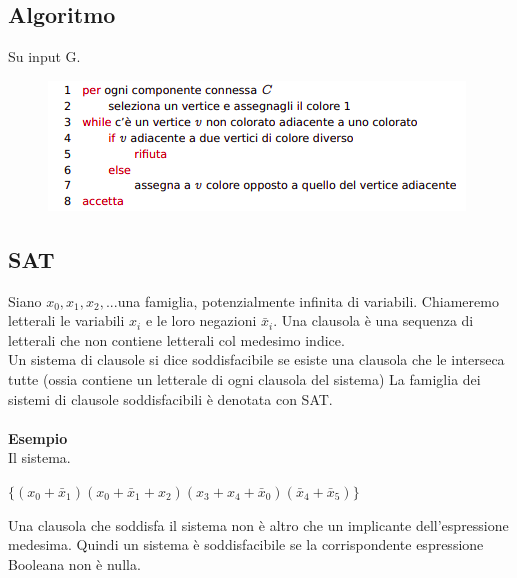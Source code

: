 \subsection{Algoritmo}
Su input G.
\begin{figure}[htp]
    \includegraphics[scale=0.9]{tesi_stile/img/foto2cap10.png}
\end{figure}
\subsection{SAT}
Siano $x_0, x_1, x_2,...$una famiglia, potenzialmente infinita di variabili. Chiameremo letterali le variabili $x_i$ e le loro negazioni $\bar{x}_i$. Una clausola è una sequenza di letterali che non contiene letterali col
medesimo indice.\\
Un sistema di clausole si dice soddisfacibile se esiste una clausola che le interseca tutte (ossia contiene un letterale di ogni clausola del sistema) La famiglia dei sistemi di clausole soddisfacibili è denotata con SAT.\\\\
\textbf{Esempio}\\
Il sistema.
\begin{center}
    $\{(x_0 + \bar{x}_1)(x_0 + \bar{x}_1 + x_2)(x_3 + x_4 + \bar{x}_0)(\bar{x}_4 + \bar{x}_5)\}$
\end{center}
Una clausola che soddisfa il sistema non è altro che un implicante dell’espressione medesima.
Quindi un sistema è soddisfacibile se la corrispondente espressione Booleana non è nulla.
